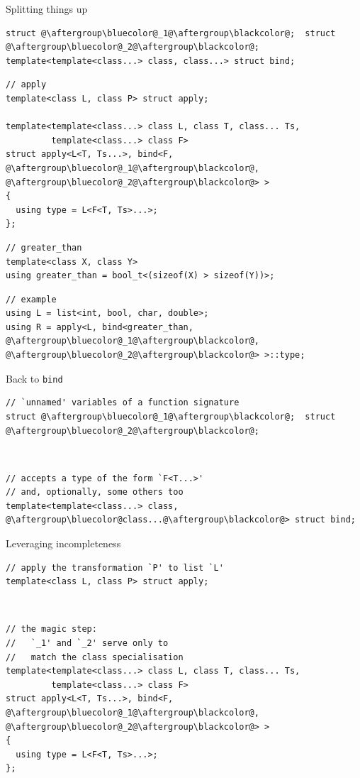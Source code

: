 \documentclass[xcolor=dvipsnames]{beamer}
\begin{document}
\begin{frame}[fragile]{Splitting things up}
\begin{lstlisting}
struct @\aftergroup\bluecolor@_1@\aftergroup\blackcolor@;  struct @\aftergroup\bluecolor@_2@\aftergroup\blackcolor@;
template<template<class...> class, class...> struct bind;
\end{lstlisting}

\begin{lstlisting}
// apply
template<class L, class P> struct apply;

template<template<class...> class L, class T, class... Ts,
         template<class...> class F>
struct apply<L<T, Ts...>, bind<F, @\aftergroup\bluecolor@_1@\aftergroup\blackcolor@, @\aftergroup\bluecolor@_2@\aftergroup\blackcolor@> >
{
  using type = L<F<T, Ts>...>;
};
\end{lstlisting}
\begin{lstlisting}
// greater_than
template<class X, class Y>
using greater_than = bool_t<(sizeof(X) > sizeof(Y))>;
\end{lstlisting}

\begin{lstlisting}
// example
using L = list<int, bool, char, double>;
using R = apply<L, bind<greater_than, @\aftergroup\bluecolor@_1@\aftergroup\blackcolor@, @\aftergroup\bluecolor@_2@\aftergroup\blackcolor@> >::type;
\end{lstlisting}
\end{frame}


\begin{frame}[fragile]{Back to \texttt{bind}}
\begin{lstlisting}
// `unnamed' variables of a function signature
struct @\aftergroup\bluecolor@_1@\aftergroup\blackcolor@;  struct @\aftergroup\bluecolor@_2@\aftergroup\blackcolor@;
\end{lstlisting}

~

\begin{lstlisting}
// accepts a type of the form `F<T...>'
// and, optionally, some others too
template<template<class...> class, @\aftergroup\bluecolor@class...@\aftergroup\blackcolor@> struct bind;
\end{lstlisting}
\end{frame}


\begin{frame}[fragile]{Leveraging incompleteness}
\begin{lstlisting}
// apply the transformation `P' to list `L'
template<class L, class P> struct apply;
\end{lstlisting}

~

\begin{lstlisting}
// the magic step:
//   `_1' and `_2' serve only to
//   match the class specialisation
template<template<class...> class L, class T, class... Ts,
         template<class...> class F>
struct apply<L<T, Ts...>, bind<F, @\aftergroup\bluecolor@_1@\aftergroup\blackcolor@, @\aftergroup\bluecolor@_2@\aftergroup\blackcolor@> >
{
  using type = L<F<T, Ts>...>;
};
\end{lstlisting}
\end{frame}
\end{document}
